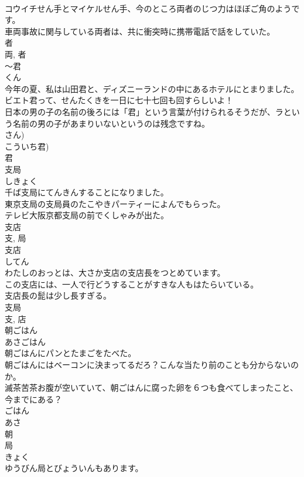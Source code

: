 \documentclass[8pt]{extreport}
\begin{document}
\begin{CJK}{UTF8}{min}
\\	コウイチせん手とマイケルせん手、今のところ両者のじつ力はほぼご角のようです。	
\\	車両事故に関与している両者は、共に衝突時に携帯電話で話をしていた。	
\\	者 
\\	両, 者	
\\	〜君	
\\	くん	
\\	今年の夏、私は山田君と、ディズニーランドの中にあるホテルにとまりました。	
\\	ビエト君って、せんたくきを一日に七十七回も回すらしいよ！	
\\	日本の男の子の名前の後ろには「君」という言葉が付けられるそうだが、ラという名前の男の子があまりいないというのは残念ですね。	
\\	さん) 
\\	こういち君) 
\\	君	
\\	支局	
\\	しきょく	
\\	千ば支局にてんきんすることになりました。	
\\	東京支局の支局員のたこやきパーティーによんでもらった。	
\\	テレビ大阪京都支局の前でくしゃみが出た。	
\\	支店 
\\	支, 局	
\\	支店	
\\	してん	
\\	わたしのおっとは、大さか支店の支店長をつとめています。	
\\	この支店には、一人で行どうすることがすきな人もはたらいている。	
\\	支店長の髭は少し長すぎる。	
\\	支局 
\\	支, 店	
\\	朝ごはん	
\\	あさごはん	
\\	朝ごはんにパンとたまごをたべた。	
\\	朝ごはんにはベーコンに決まってるだろ？こんな当たり前のことも分からないのか。	
\\	滅茶苦茶お腹が空いていて、朝ごはんに腐った卵を６つも食べてしまったこと、今までにある？	
\\	ごはん 
\\	あさ 
\\	朝	
\\	局	
\\	きょく	
\\	ゆうびん局とびょういんもあります。	

\end{CJK}
\end{document}
